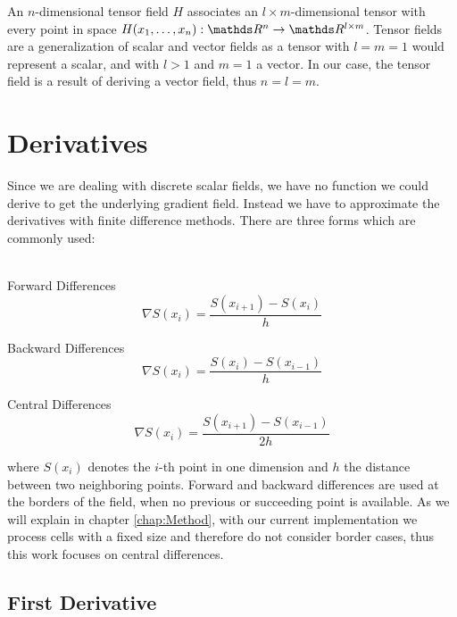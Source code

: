 An $n$-dimensional tensor field $H$ associates an $l \times m$-dimensional
tensor with every point in space $H(x_1,\dots,x_n): \real^n \rightarrow
\real^{l \times m}$. Tensor fields are a generalization of scalar and
vector fields as a tensor with $l = m = 1$ would represent a scalar, and
with $l > 1$ and $m = 1$ a vector. In our case, the tensor field is a
result of deriving a vector field, thus $n = l = m$.

\section{Derivatives}

Since we are dealing with discrete scalar fields, we have no function we
could derive to get the underlying gradient field. Instead we have to
approximate the derivatives with finite difference methods. There are
three forms which are commonly used:\\
\\
\begin{inparaenum}[(a)]
  \item Forward Differences
  \begin{equation}
    \nabla S(x_i) = \frac{S(x_{i+1}) - S(x_i)}{h}
  \end{equation}
  \item Backward Differences
  \begin{equation}
    \nabla S(x_i) = \frac{S(x_i) - S(x_{i-1})}{h}
  \end{equation}
  \item Central Differences
  \begin{equation}
    \nabla S(x_i) = \frac{S(x_{i+1}) - S(x_{i-1})}{2h}
  \end{equation}
\end{inparaenum}
where $S(x_i)$ denotes the $i$-th point in one dimension and $h$ the
distance between two neighboring points. Forward and backward differences
are used at the borders of the field, when no previous or succeeding
point is available. As we will explain in chapter \ref{chap:Method},
with our current implementation we process cells with a fixed size and
therefore do not consider border cases, thus this work focuses on central
differences.

\subsection{First Derivative}



